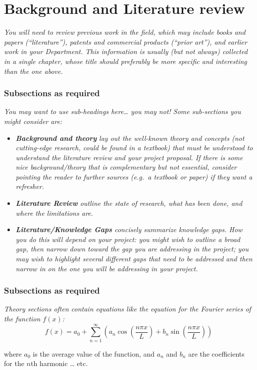 \documentclass[12pt,openany,a4paper]{book}
\newcommand{\purple}[1]{\textcolor{topicpurple}{\textit{#1}}}
\begin{document}
\chapter{Background and Literature review}

\purple{You will need to review previous work in the field, which may include
books and papers (``literature''), patents and commercial products
(``prior art''), and earlier work in your Department.  This
information is usually (but not always) collected in a single chapter,
whose title should preferably be more specific and interesting than
the one above.}

\subsection{Subsections as required}
\purple{ You may want to use sub-headings here\dots{} you may not!
Some sub-sections you might consider are:}
\begin{itemize}
  \item\purple{\textbf{Background and theory} lay out the well-known theory and concepts (not cutting-edge research, could be found in a textbook) that must be understood to understand the literature review and your project proposal. If there is some nice background/theory that is complementary but not essential, consider pointing the reader to further sources (e.g.\ a textbook or paper) if they want a refresher.}
  \item \purple{\textbf{Literature Review} outline the state of research, what has been done, and where the limitations are.}
  \item \purple{\textbf{Literature/Knowledge Gaps} concisely summarize knowledge gaps. How you do this will depend on your project: you might wish to outline a broad gap, then narrow down toward the gap you are addressing in the project; you may wish to highlight several different gaps that need to be addressed and then narrow in on the one you will be addressing in your project.}
\end{itemize}

\subsection{Subsections as required}
{\color{topicpurple}\itshape
Theory sections often contain equations like the equation for the Fourier series of the function \(f(x)\):
\begin{equation}
\label{eq:fourier-series}
f(x)=a_{0}+\sum_{n=1}^{\infty}\left(a_{n}\cos\!\left(\frac{n\pi x}{L}\right)+b_{n}\sin\!\left(\frac{n\pi x}{L}\right)\right)
\end{equation}

where \(a_{0}\) is the average value of the function, and \(a_{n}\) and \(b_{n}\) are the coefficients for the \(n\)th harmonic \dots{} etc.
}
\end{document}
